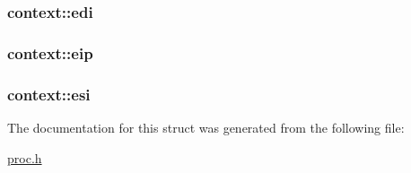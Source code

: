 \subsubsection[{\texorpdfstring{edi}{edi}}]{ context\+::edi}\hypertarget{structcontext_a9c926d583d00a615327b9b4a8fe0ab63}{}\label{structcontext_a9c926d583d00a615327b9b4a8fe0ab63}
\subsubsection[{\texorpdfstring{eip}{eip}}]{ context\+::eip}\hypertarget{structcontext_a0cfb49e5b03fd7bf12fa79d1a42be935}{}\label{structcontext_a0cfb49e5b03fd7bf12fa79d1a42be935}
\subsubsection[{\texorpdfstring{esi}{esi}}]{ context\+::esi}\hypertarget{structcontext_a9596ea769c8681490bbc67fd1b0abc92}{}\label{structcontext_a9596ea769c8681490bbc67fd1b0abc92}


The documentation for this struct was generated from the following file\+:\begin{DoxyCompactItemize}
\item 
\hyperlink{proc_8h}{proc.\+h}\end{DoxyCompactItemize}
